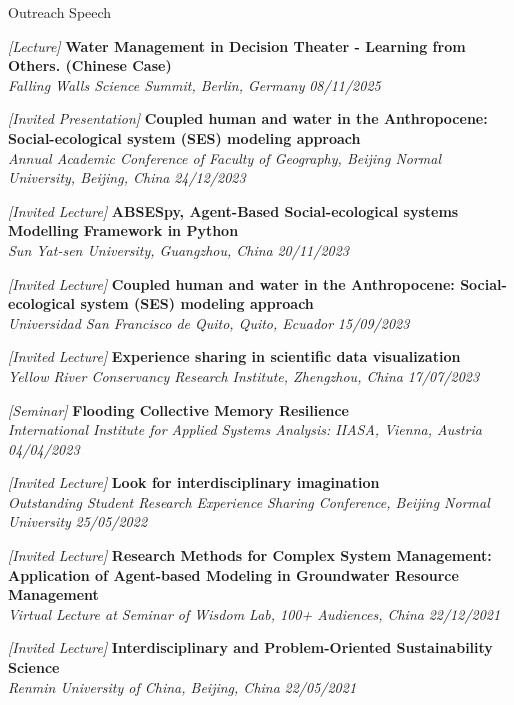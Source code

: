 \documentclass{resume} %
\newcommand{\projectentry}[4]{\textit{[#1]} {\bf #2} \\ \textnormal{\em #3} \hfill {\em #4}}
\begin{document}
\begin{rSection}{Outreach Speech}

    \projectentry{Lecture}{Water Management in Decision Theater - Learning from Others. (Chinese Case)}{Falling Walls Science Summit, Berlin, Germany}{08/11/2025}

    \projectentry{Invited Presentation}{Coupled human and water in the Anthropocene: Social-ecological system (SES) modeling approach}{Annual Academic Conference of Faculty of Geography, Beijing Normal University, Beijing, China}{24/12/2023}

    \projectentry{Invited Lecture}{ABSESpy, Agent-Based Social-ecological systems Modelling Framework in Python}{Sun Yat-sen University, Guangzhou, China}{20/11/2023}

    \projectentry{Invited Lecture}{Coupled human and water in the Anthropocene: Social-ecological system (SES) modeling approach}{Universidad San Francisco de Quito, Quito, Ecuador}{15/09/2023}

    \projectentry{Invited Lecture}{Experience sharing in scientific data visualization}{Yellow River Conservancy Research Institute, Zhengzhou, China}{17/07/2023}

    \projectentry{Seminar}{Flooding Collective Memory Resilience}{International Institute for Applied Systems Analysis: IIASA, Vienna, Austria}{04/04/2023}

    \projectentry{Invited Lecture}{Look for interdisciplinary imagination}{Outstanding Student Research Experience Sharing Conference, Beijing Normal University}{25/05/2022}

    \projectentry{Invited Lecture}{Research Methods for Complex System Management: Application of Agent-based Modeling in Groundwater Resource Management}{Virtual Lecture at Seminar of Wisdom Lab, 100+ Audiences, China}{22/12/2021}


    \projectentry{Invited Lecture}{Interdisciplinary and Problem-Oriented Sustainability Science}{Renmin University of China, Beijing, China}{22/05/2021}

\end{rSection}
\end{document}

